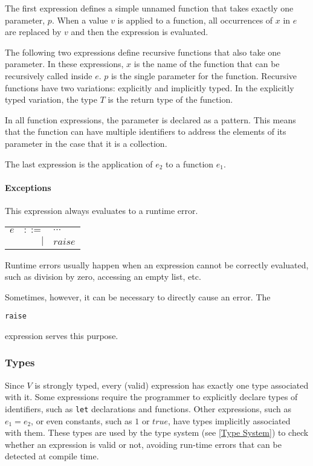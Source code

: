 \documentclass{article}
\def\code#1{\begin{footnotesize}\texttt{#1}\end{footnotesize}}
\begin{document}
\bigskip

The first expression defines a simple unnamed function that takes exactly one parameter, $p$.
When a value $v$ is applied to a function, all occurrences of $x$ in $e$ are replaced by $v$ and then the expression is evaluated.

\medskip

The following two expressions define recursive functions that also take one parameter.
In these expressions, $x$ is the name of the function that can be recursively called inside $e$.
$p$ is the single parameter for the function.
Recursive functions have two variations: explicitly and implicitly typed.
In the explicitly typed variation, the type $T$ is the return type of the function.

\medskip

In all function expressions, the parameter is declared as a pattern.
This means that the function can have multiple identifiers to address the elements of its parameter in the case that it is a collection.

\medskip

The last expression is the application of $e_2$ to a function $e_1$.

\paragraph{Exceptions}

This expression always evaluates to a runtime error.

\medskip

{\setlength\tabcolsep{8pt}
\begin{tabular}{>{$}l<{$}>{$}r<{$}>{$}l<{$}}
e &::= &\cdots\\
    &| &raise\\
\end{tabular}}

\bigskip

Runtime errors usually happen when an expression cannot be correctly evaluated, such as division by zero, accessing an empty list, etc.

Sometimes, however, it can be necessary to directly cause an error.
The \code{raise} expression serves this purpose.

\subsubsection{Types}

Since $V$ is strongly typed, every (valid) expression has exactly one type associated with it.
Some expressions require the programmer to explicitly declare types of identifiers, such as \texttt{let} declarations and functions.
Other expressions, such as $e_1 = e_2$, or even constants, such as $1$ or $true$, have types implicitly associated with them.
These types are used by the type system (see \ref{Type System}) to check whether an expression is valid or not, avoiding run-time errors that can be detected at compile time.
\end{document}
